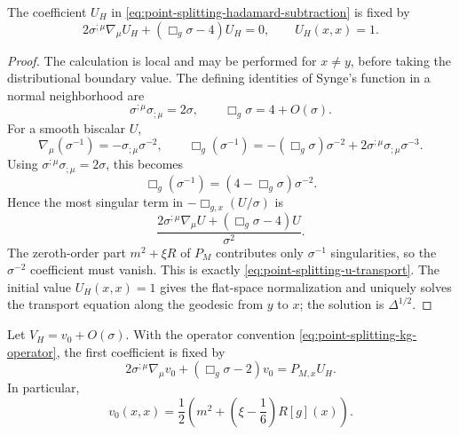 \begin{lemma}
\label{lem:leading-hadamard-transport-equation}
The coefficient \(U_H\) in
\eqref{eq:point-splitting-hadamard-subtraction} is fixed by
\begin{equation}
  2\sigma^{;\mu}\nabla_\mu U_H
  +
  (\Box_g\sigma-4)U_H=0,
  \qquad U_H(x,x)=1 .
  \label{eq:point-splitting-u-transport}
\end{equation}
\end{lemma}

\begin{proof}
The calculation is local and may be performed for \(x\ne y\), before taking
the distributional boundary value.  The defining identities of Synge's
function in a normal neighborhood are
\begin{equation}
  \sigma^{;\mu}\sigma_{;\mu}=2\sigma,\qquad
  \Box_g\sigma=4+O(\sigma).
  \label{eq:point-splitting-synge-identities}
\end{equation}
For a smooth biscalar \(U\),
\[
  \nabla_\mu(\sigma^{-1})=-\sigma_{;\mu}\sigma^{-2},
  \qquad
  \Box_g(\sigma^{-1})
  =
  -(\Box_g\sigma)\sigma^{-2}
  +2\sigma^{;\mu}\sigma_{;\mu}\sigma^{-3}.
\]
Using \(\sigma^{;\mu}\sigma_{;\mu}=2\sigma\), this becomes
\[
  \Box_g(\sigma^{-1})=(4-\Box_g\sigma)\sigma^{-2}.
  \]
Hence the most singular term in
\(-\Box_{g,x}(U/\sigma)\) is
\[
  \frac{
    2\sigma^{;\mu}\nabla_\mu U
    +(\Box_g\sigma-4)U
  }{\sigma^2}.
\]
The zeroth-order part \(m^2+\xi R\) of \(P_M\) contributes only
\(\sigma^{-1}\) singularities, so the \(\sigma^{-2}\) coefficient must
vanish.  This is exactly \eqref{eq:point-splitting-u-transport}.  The
initial value \(U_H(x,x)=1\) gives the flat-space normalization and uniquely
solves the transport equation along the geodesic from \(y\) to \(x\); the
solution is \(\Delta^{1/2}\).
\end{proof}

\begin{lemma}
\label{lem:first-logarithmic-hadamard-coefficient}
Let \(V_H=v_0+O(\sigma)\).  With the operator convention
\eqref{eq:point-splitting-kg-operator}, the first coefficient is fixed by
\begin{equation}
  2\sigma^{;\mu}\nabla_\mu v_0
  +
  (\Box_g\sigma-2)v_0
  =
  P_{M,x}U_H .
  \label{eq:point-splitting-v0-transport}
\end{equation}
In particular,
\begin{equation}
  v_0(x,x)
  =
  \frac12\left(m^2+\left(\xi-\frac16\right)R[g](x)\right).
  \label{eq:point-splitting-v0-coincidence}
\end{equation}
\end{lemma}

